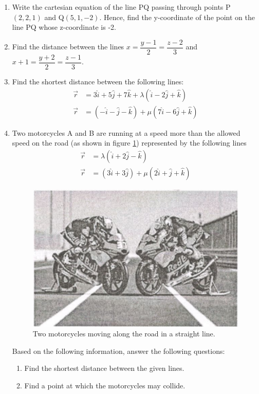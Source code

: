 \begin{enumerate}
	\item Write the cartesian equation of the line PQ passing through points P$(2,2,1)$ and Q$(5,1,-2)$. Hence, find the y-coordinate of the point on the line PQ whose z-coordinate is -2.

	\item Find the distance between the lines $x=\dfrac{y-1}{2}=\dfrac{z-2}{3}$ and $x+1=\dfrac{y+2}{2}=\dfrac{z-1}{3}$.
	
	\item Find the shortest distance between the following lines:
		\begin{align}
			\vec{r}&=3\hat{i}+5\hat{j}+7\hat{k}+\lambda(\hat{i}-2\hat{j}+\hat{k})\\\vec{r}&=(-\hat{i}-\hat{j}-\hat{k})+\mu(7\hat{i}-6\hat{j}+\hat{k})
		\end{align}

	\item Two motorcycles A and B are running at a speed more than the allowed speed on the road (as shown in figure \ref{fig:bike1}) represented by the following lines 
		\begin{align}
			\vec{r}&=\lambda(\hat{i}+2\hat{j}-\hat{k})\\\vec{r}&=(3\hat{i}+3\hat{j})+\mu(2\hat{i}+\hat{j}+\hat{k})
		\end{align}
		\begin{figure}[H]
			\centering
			\includegraphics[width=\columnwidth]{figs/bike}
			\caption{Two motorcycles moving along the road in a straight line.}
			\label{fig:bike1}
		\end{figure}
		Based on the following information, answer the following questions:
		\begin{enumerate}
			\item Find the shortest distance between the given lines.
			\item Find a point at which the motorcycles may collide.
		\end{enumerate}
	

\end{enumerate}
